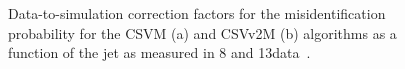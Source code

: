\begin{figure}[!htb]
\begin{center}
\end{center} 
\caption{Data-to-simulation correction factors for the misidentification probability for the CSVM (a) and CSVv2M (b) algorithms as a function of the jet \pt as measured in 8 and 13\TeV data~\cite{CMS:BTV13001,CMS-PAS-BTV-15-001}.}
\label{fig:btag_sfl}
\end{figure}